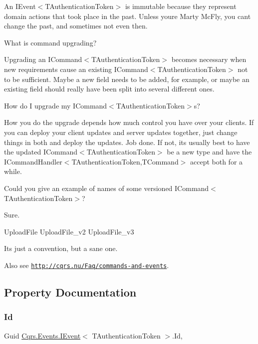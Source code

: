 An I\+Event$<$\+T\+Authentication\+Token$>$ is immutable because they represent domain actions that took place in the past. Unless you\textquotesingle{}re Marty Mc\+Fly, you can\textquotesingle{}t change the past, and sometimes not even then.

What is command upgrading?

Upgrading an I\+Command$<$\+T\+Authentication\+Token$>$ becomes necessary when new requirements cause an existing I\+Command$<$\+T\+Authentication\+Token$>$ not to be sufficient. Maybe a new field needs to be added, for example, or maybe an existing field should really have been split into several different ones.

How do I upgrade my I\+Command$<$\+T\+Authentication\+Token$>$s?

How you do the upgrade depends how much control you have over your clients. If you can deploy your client updates and server updates together, just change things in both and deploy the updates. Job done. If not, it\textquotesingle{}s usually best to have the updated I\+Command$<$\+T\+Authentication\+Token$>$ be a new type and have the I\+Command\+Handler$<$\+T\+Authentication\+Token,\+T\+Command$>$ accept both for a while.

Could you give an example of names of some versioned I\+Command$<$\+T\+Authentication\+Token$>$?

Sure.

Upload\+File Upload\+File\+\_\+v2 Upload\+File\+\_\+v3

It\textquotesingle{}s just a convention, but a sane one. 

 Also see \href{http://cqrs.nu/Faq/commands-and-events}{\tt http\+://cqrs.\+nu/\+Faq/commands-\/and-\/events}. 

\subsection{Property Documentation}
\mbox{\label{interfaceCqrs_1_1Events_1_1IEvent_a2974e13d307c62c5cc438d668ff1783b}} 
\subsubsection{\texorpdfstring{Id}{Id}}
{\footnotesize\ttfamily Guid \hyperlink{interfaceCqrs_1_1Events_1_1IEvent}{Cqrs.\+Events.\+I\+Event}$<$ T\+Authentication\+Token $>$.Id\hspace{0.3cm}{\ttfamily [get]}, {\ttfamily [set]}}


